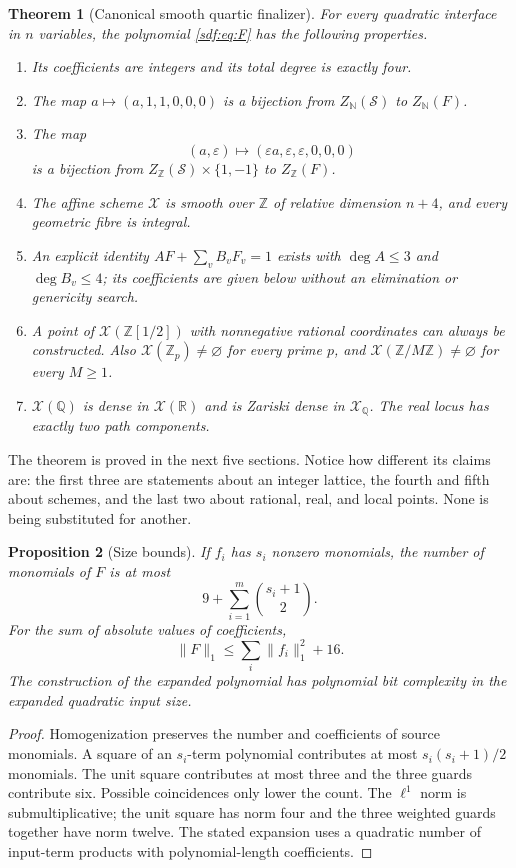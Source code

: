 \documentclass[11pt,a4paper]{article}
\newtheorem{theorem}{Theorem}[section]
\newtheorem{proposition}[theorem]{Proposition}
\theoremstyle{definition}
\theoremstyle{remark}
\newcommand{\N}{\mathbb N}
\newcommand{\Z}{\mathbb Z}
\newcommand{\Q}{\mathbb Q}
\newcommand{\R}{\mathbb R}
\newcommand{\zeros}[2]{Z_{#1}(#2)}
\newcommand{\source}{\mathcal S}
\newcommand{\variety}{\mathcal X}
\begin{document}
\begin{theorem}[Canonical smooth quartic finalizer]\label{sdf:thm:main}
For every quadratic interface in $n$ variables, the polynomial
\eqref{sdf:eq:F} has the following properties.
\begin{enumerate}[label=\textnormal{(\roman*)}]
\item Its coefficients are integers and its total degree is exactly four.
\item The map $a\mapsto(a,1,1,0,0,0)$ is a bijection from
$\zeros{\N}{\source}$ to $\zeros{\N}{F}$.
\item The map
\[
 (a,\varepsilon)\longmapsto
 (\varepsilon a,\varepsilon,\varepsilon,0,0,0)
\]
is a bijection from $\zeros{\Z}{\source}\times\{1,-1\}$ to
$\zeros{\Z}{F}$.
\item The affine scheme $\variety$ is smooth over $\Z$ of relative dimension
$n+4$, and every geometric fibre is integral.
\item An explicit identity $AF+\sum_v B_vF_v=1$ exists with
$\deg A\le3$ and $\deg B_v\le4$; its coefficients are given below without
an elimination or genericity search.
\item A point of $\variety(\Z[1/2])$ with nonnegative rational coordinates
can always be constructed. Also $\variety(\Z_p)\ne\varnothing$ for every
prime $p$, and $\variety(\Z/M\Z)\ne\varnothing$ for every $M\ge1$.
\item $\variety(\Q)$ is dense in $\variety(\R)$ and is Zariski dense in
$\variety_\Q$. The real locus has exactly two path components.
\end{enumerate}
\end{theorem}

The theorem is proved in the next five sections. Notice how different its
claims are: the first three are statements about an integer lattice, the
fourth and fifth about schemes, and the last two about rational, real, and
local points. None is being substituted for another.

\begin{proposition}[Size bounds]\label{sdf:prop:size}
If $f_i$ has $s_i$ nonzero monomials, the number of monomials of $F$ is at
most
\[
 9+\sum_{i=1}^m\binom{s_i+1}{2}.
\]
For the sum of absolute values of coefficients,
\[
 \lVert F\rVert_1\le \sum_i\lVert f_i\rVert_1^2+16.
\]
The construction of the expanded polynomial has polynomial bit complexity
in the expanded quadratic input size.
\end{proposition}
\begin{proof}
Homogenization preserves the number and coefficients of source monomials.
A square of an $s_i$-term polynomial contributes at most
$s_i(s_i+1)/2$ monomials. The unit square contributes at most three and
the three guards contribute six. Possible coincidences only lower the
count. The $\ell^1$ norm is submultiplicative; the unit square has norm four
and the three weighted guards together have norm twelve. The stated expansion uses a
quadratic number of input-term products with polynomial-length coefficients.
\end{proof}
\end{document}
